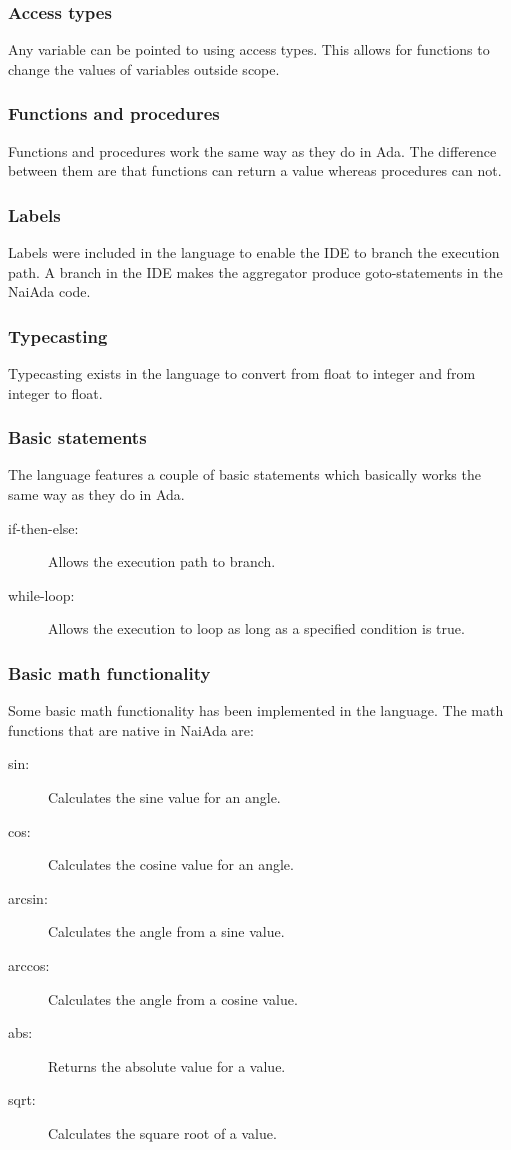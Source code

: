 \subsubsection{Access types}
Any variable can be pointed to using access types. This allows for functions to change the values of variables outside scope.

\subsubsection{Functions and procedures}
Functions and procedures work the same way as they do in Ada. The difference between them are that functions can return a value whereas procedures can not.

\subsubsection{Labels}
Labels were included in the language to enable the IDE to branch the execution path. A branch in the IDE makes the aggregator produce goto-statements in the NaiAda code.

\subsubsection{Typecasting}
Typecasting exists in the language to convert from float to integer and from integer to float.

\subsubsection{Basic statements}
The language features a couple of basic statements which basically works the same way as they do in Ada.
\begin{description}
\item[if-then-else:] Allows the execution path to branch.
\item[while-loop:] Allows the execution to loop as long as a specified condition is true.
\end{description}

\subsubsection{Basic math functionality}
Some basic math functionality has been implemented in the language. The math functions that are native in NaiAda are:
\begin{description}
\item[sin:] Calculates the sine value for an angle.
\item[cos:] Calculates the cosine value for an angle.
\item[arcsin:] Calculates the angle from a sine value.
\item[arccos:] Calculates the angle from a cosine value.
\item[abs:] Returns the absolute value for a value.
\item[sqrt:] Calculates the square root of a value.
\end{description}


